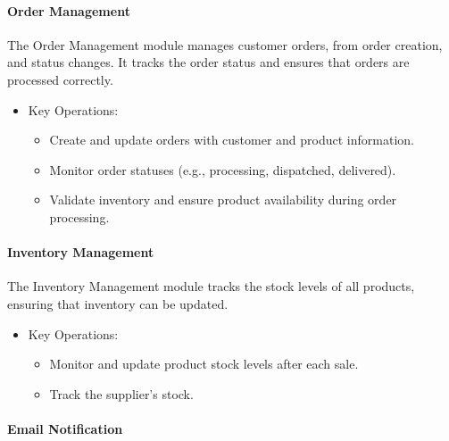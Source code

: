 \documentclass{llncs}
\begin{document}
\paragraph{Order Management} \leavevmode

The Order Management module manages customer orders, from order creation, and status changes. It tracks the order status and ensures that orders are processed correctly.
\begin{itemize}
    \item Key Operations:
          \begin{itemize}
              \item Create and update orders with customer and product information.
              \item Monitor order statuses (e.g., processing, dispatched, delivered).
              \item Validate inventory and ensure product availability during order processing.
          \end{itemize}
\end{itemize}

\paragraph{Inventory Management} \leavevmode

The Inventory Management module tracks the stock levels of all products, ensuring that inventory can be updated.
\begin{itemize}
    \item Key Operations:
          \begin{itemize}
              \item Monitor and update product stock levels after each sale.
              \item Track the supplier’s stock.
          \end{itemize}
\end{itemize}



\paragraph{Email Notification} \leavevmode
\end{document}
